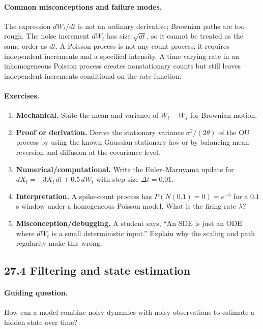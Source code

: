 \paragraph{Common misconceptions and failure modes.}
The expression \(dW_t/dt\) is not an ordinary derivative; Brownian paths are too rough. The noise increment \(dW_t\) has size \(\sqrt{dt}\), so it cannot be treated as the same order as \(dt\). A Poisson process is not any count process; it requires independent increments and a specified intensity. A time-varying rate in an inhomogeneous Poisson process creates nonstationary counts but still leaves independent increments conditional on the rate function.

\paragraph{Exercises.}
\begin{enumerate}[label=\textbf{27.3.\arabic*.}, leftmargin=*]
\item \textbf{Mechanical.} State the mean and variance of \(W_t-W_s\) for Brownian motion.
\item \textbf{Proof or derivation.} Derive the stationary variance \(\sigma^2/(2\theta)\) of the OU process by using the known Gaussian stationary law or by balancing mean reversion and diffusion at the covariance level.
\item \textbf{Numerical/computational.} Write the Euler--Maruyama update for \(dX_t=-3X_t\,dt+0.5\,dW_t\) with step size \(\Delta t=0.01\).
\item \textbf{Interpretation.} A spike-count process has \(P(N(0.1)=0)=e^{-5}\) for a \(0.1\) s window under a homogeneous Poisson model. What is the firing rate \(\lambda\)?
\item \textbf{Misconception/debugging.} A student says, ``An SDE is just an ODE where \(dW_t\) is a small deterministic input.'' Explain why the scaling and path regularity make this wrong.
\end{enumerate}

\subsection{27.4 Filtering and state estimation}

\paragraph{Guiding question.}
How can a model combine noisy dynamics with noisy observations to estimate a hidden state over time?

